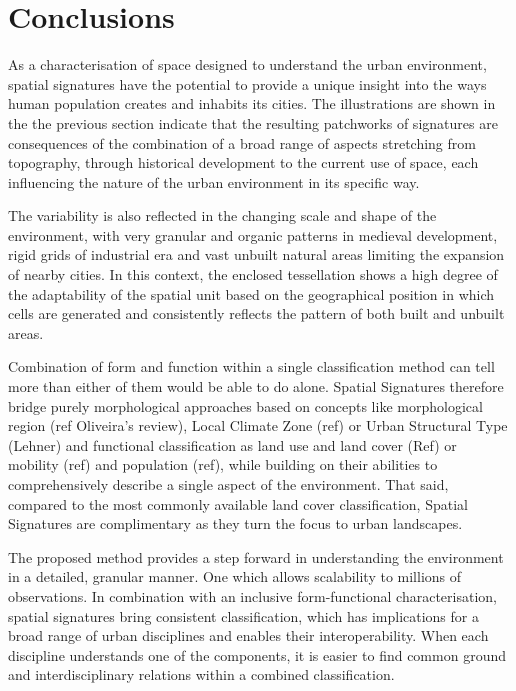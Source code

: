 \section{Conclusions}
\label{sec:conclusions}

As a characterisation of space designed to understand the urban environment,
spatial signatures have the potential to provide a unique insight into the ways
human population creates and inhabits its cities. The illustrations are shown in the
the previous section indicate that the resulting patchworks of signatures are consequences
of the combination of a broad range of aspects stretching from topography, through
historical development to the current use of space, each influencing the nature of
the urban environment in its specific way.

The variability is also reflected in the changing scale and shape of the environment,
with very granular and organic patterns in medieval development, rigid grids of
industrial era and vast unbuilt natural areas limiting the expansion of nearby
cities. In this context, the enclosed tessellation shows a high degree of
the adaptability of the spatial unit based on the geographical position in which
cells are generated and consistently reflects the pattern of both built and
unbuilt areas.

Combination of form and function within a single classification method can tell
more than either of them would be able to do alone. Spatial Signatures therefore
bridge purely morphological approaches based on concepts like morphological
region (ref Oliveira's review), Local Climate Zone (ref) or Urban Structural
Type (Lehner) and functional classification as land use and land cover (Ref) or
mobility (ref) and population (ref), while building on their abilities to
comprehensively describe a single aspect of the environment.
That said, compared to the most commonly available land cover classification,
Spatial Signatures are complimentary as they turn the focus to urban landscapes.

The proposed method provides a step forward in understanding the environment in
a detailed, granular manner. One which allows scalability to millions of
observations. In combination with an inclusive form-functional characterisation,
spatial signatures bring consistent classification, which has implications for a
broad range of urban disciplines and enables their interoperability. When each discipline understands one of the components, it is easier to find common ground and interdisciplinary relations within a combined classification.

